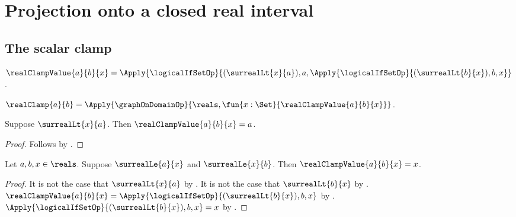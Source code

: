 





\section{Projection onto a closed real interval}

\subsection{The scalar clamp}

\begin{definition}\label{real_clamp_value}
    $\realClampValue{a}{b}{x}
        =\Apply{\logicalIfSetOp}{(\surrealLt{x}{a}),a,
            \Apply{\logicalIfSetOp}{(\surrealLt{b}{x}),b,x}}$.
\end{definition}

\begin{definition}\label{real_clamp}
    $\realClamp{a}{b}=\Apply{\graphOnDomainOp}
        {\reals,\fun{x:\Set}{\realClampValue{a}{b}{x}}}$.
\end{definition}

\begin{proposition}\label{real_clamp_value_below}
    Suppose $\surrealLt{x}{a}$.
    Then $\realClampValue{a}{b}{x}=a$.
\end{proposition}
\begin{proof}
    Follows by .
\end{proof}

\begin{proposition}\label{real_clamp_value_inside}
    Let $a,b,x\in\reals$.
    Suppose $\surrealLe{a}{x}$ and $\surrealLe{x}{b}$.
    Then $\realClampValue{a}{b}{x}=x$.
\end{proposition}
\begin{proof}
    It is not the case that $\surrealLt{x}{a}$
        by
        .
    It is not the case that $\surrealLt{b}{x}$
        by
        .
    $\realClampValue{a}{b}{x}
        =\Apply{\logicalIfSetOp}{(\surrealLt{b}{x}),b,x}$
        by .
    $\Apply{\logicalIfSetOp}{(\surrealLt{b}{x}),b,x}=x$
        by .
\end{proof}

